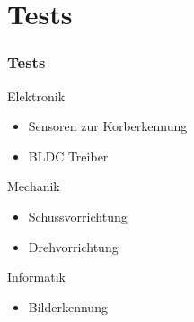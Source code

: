 \section{Tests} %
\begin{frame}
    \frametitle{Tests}
    \pause
    \begin{block}{Elektronik}
        \begin{itemize}
            \item Sensoren zur Korberkennung
            \item BLDC Treiber
        \end{itemize}
    \end{block}
    \pause
    \begin{block}{Mechanik}
        \begin{itemize}
            \item Schussvorrichtung
            \item Drehvorrichtung
        \end{itemize}
    \end{block}
    \pause
    \begin{block}{Informatik}
        \begin{itemize}
            \item Bilderkennung
        \end{itemize}
    \end{block}
\end{frame}

